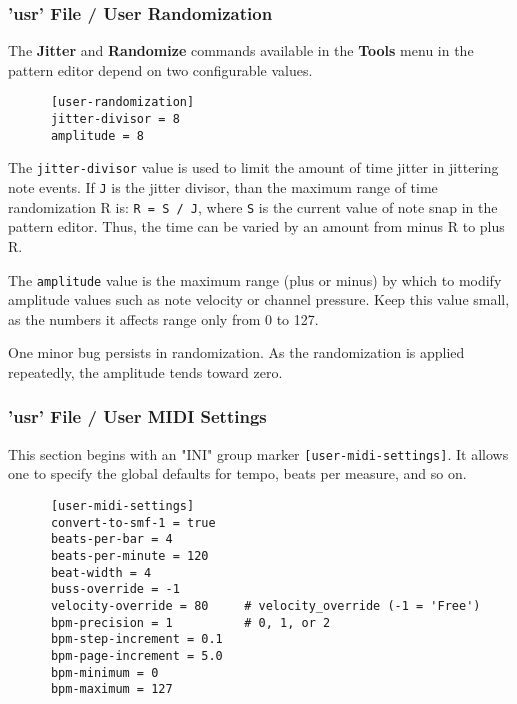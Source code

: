 \subsubsection{'usr' File / User Randomization}
\label{subsubsec:usr_file_user_randomization}

   The \textbf{Jitter} and \textbf{Randomize} commands available in
   the \textbf{Tools} menu in the pattern editor depend on
   two configurable values.

   \begin{verbatim}
      [user-randomization]
      jitter-divisor = 8
      amplitude = 8
   \end{verbatim}

   The \texttt{jitter-divisor} value is used to limit the amount of time
   jitter in jittering note events.  If \texttt{J} is the jitter divisor, than
   the maximum range of time randomization R is: \texttt{R = S / J}, where
   \texttt{S} is the current value of note snap in the pattern editor.
   Thus, the time can be varied by an amount from minus R to plus R.

   The \texttt{amplitude} value is the maximum range (plus or minus) by which
   to modify amplitude values such as note velocity or channel pressure.
   Keep this value small, as the numbers it affects range only from
   0 to 127.

   One minor bug persists in randomization.  As the randomization is applied
   repeatedly, the amplitude tends toward zero.

\subsubsection{'usr' File / User MIDI Settings}
\label{subsubsec:usr_file_user_midi_settings}

   This section begins with an
   "INI" group marker \texttt{[user-midi-settings]}.
   It allows one to specify the
   global defaults for tempo, beats per measure, and so on.

   \begin{verbatim}
      [user-midi-settings]
      convert-to-smf-1 = true
      beats-per-bar = 4
      beats-per-minute = 120
      beat-width = 4
      buss-override = -1
      velocity-override = 80     # velocity_override (-1 = 'Free')
      bpm-precision = 1          # 0, 1, or 2
      bpm-step-increment = 0.1
      bpm-page-increment = 5.0
      bpm-minimum = 0
      bpm-maximum = 127
   \end{verbatim}

